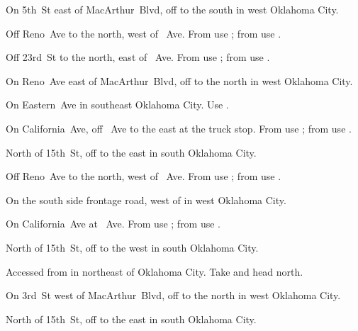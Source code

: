 
\begin{LocationList}

On 5th~St east of MacArthur~Blvd, off   to the south in west Oklahoma City.

Off Reno~Ave to the north, west of \MLKing~Ave.
From  use ; from  use .
	
Off 23rd~St to the north, east of \MLKing~Ave.
From  use ; from  use .

On Reno~Ave east of MacArthur~Blvd, off   to the north in west Oklahoma City.

\Location{\GarageHQ \Garage}
On Eastern~Ave in southeast Oklahoma City.
Use  .

On California~Ave, off \MLKing~Ave to the east at the truck stop.
From  use ; from  use .

North of 15th~St, off   to the east in south Oklahoma City.

Off Reno~Ave to the north, west of \MLKing~Ave.
From  use ; from  use .

On the south side  frontage road, west of  in west Oklahoma City.

\Location{\TruckStop \Gas \Rest \Service \Weigh}
On California~Ave at \MLKing~Ave.
From  use ; from  use .

\pagebreak[3]  %

North of 15th~St, off   to the west in south Oklahoma City.

Accessed from  in  northeast of Oklahoma City.
Take   and head north.

On 3rd~St west of MacArthur~Blvd, off   to the north in west Oklahoma City.

North of 15th~St, off   to the east in south Oklahoma City.

\end{LocationList}
